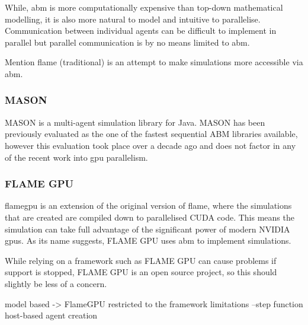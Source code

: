 \documentclass{UoYCSproject}
\begin{document}
While, \acrlong{abm} is more computationally expensive than top-down mathematical modelling, it is also more natural to model and intuitive to parallelise\cite{flame_simulation}.
Communication between individual agents can be difficult to implement in parallel but parallel communication is by no means limited to \gls{abm}.


Mention \acrshort{flame} (traditional) is an attempt to make simulations more accessible via \acrshort{abm}.


\subsubsection{\gls{MASON}}
\gls{MASON} is a multi-agent simulation library for Java.
\gls{MASON} has been previously evaluated as the one of the fastest sequential ABM libraries available\cite{abm_platforms_review}, however this evaluation took place over a decade ago and does not factor in any of the recent work into \acrshort{gpu} parallelism.

\subsubsection{\gls{FLAME GPU}}
\acrfull{flamegpu} is an extension of the original version of \acrshort{flame}, where the simulations that are created are compiled down to parallelised CUDA code. This means the simulation can take full advantage of the significant power of modern NVIDIA \acrshort{gpu}s.
As its name suggests, \gls{FLAME GPU} uses \acrlong{abm} to implement simulations.

While relying on a framework such as \gls{FLAME GPU} can cause problems if support is stopped, \gls{FLAME GPU} is an open source project, so this should slightly be less of a concern.

model based -> FlameGPU\cite{flame_keratinocyte}
    restricted to the framework limitations
    --step function host-based agent creation
\end{document}
